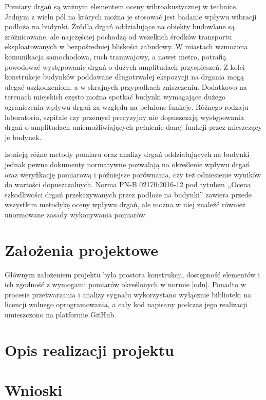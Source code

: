 \documentclass[a4paper,12pt]{mwart}
\begin{document}
Pomiary drgań są ważnym elementem oceny wibroakustycznej w technice. Jednym
z wielu pól na których można je stosować jest badanie wpływu wibracji
podłoża na budynki. Źródła drgań oddziałujące na obiekty budowlane są
zróżnicowane, ale najczęściej pochodzą od wszelkich środków transportu
eksploatowanych w bezpośredniej bliskości zabudowy. W miastach wzmożona
komunikacja samochodowa, ruch tramwajowy, a nawet metro, potrafią powodować
występowanie drgań o dużych amplitudach przyspieszeń. Z kolei konstrukcje
budynków poddawane długotrwałej ekspozycji na drgania mogą ulegać
uszkodzeniom, a w skrajnych przypadkach zniszczeniu. Dodatkowo na terenach
miejskich często można spotkać budynki wymagające dużego ograniczenia wpływu
drgań za względu na pełnione funkcje. Różnego rodzaju laboratoria, szpitale
czy przemysł precyzyjny nie dopuszczają występowania drgań o amplitudach
uniemożliwiających pełnienie danej funkcji przez mieszczący je budynek.

Istnieją różne metody pomiaru oraz analizy drgań oddziałujących na budynki
jednak pewne dokumenty normatywne pozwalają na określenie wpływu drgań oraz
weryfikację pomiarową i późniejsze porównania, czy też odniesienie wyników
do wartości dopuszczalnych. Norma PN-B 02170:2016-12 pod tytułem ,,Ocena
szkodliwości drgań przekazywanych przez podłoże na budynki'' \cite{norma}
zawiera przede wszystkim metodykę oceny wpływu drgań, ale można w niej
znaleźć również unormowane zasady wykonywania pomiarów.

\section{Założenia projektowe}

Głównym założeniem projektu była prostota konstrukcji, dostępność elementów i
ich zgodność z wymogami pomiarów określonych w normie [odn]. Ponadto w procesie
przetwarzania i analizy sygnału wykorzystano wyłącznie biblioteki na licencji
wolnego oprogramowania, a cały kod napisany podczas jego realizacji umieszczono
na platformie GitHub.

\section{Opis realizacji projektu}

\section{Wnioski}

\printbibliography
\end{document}

